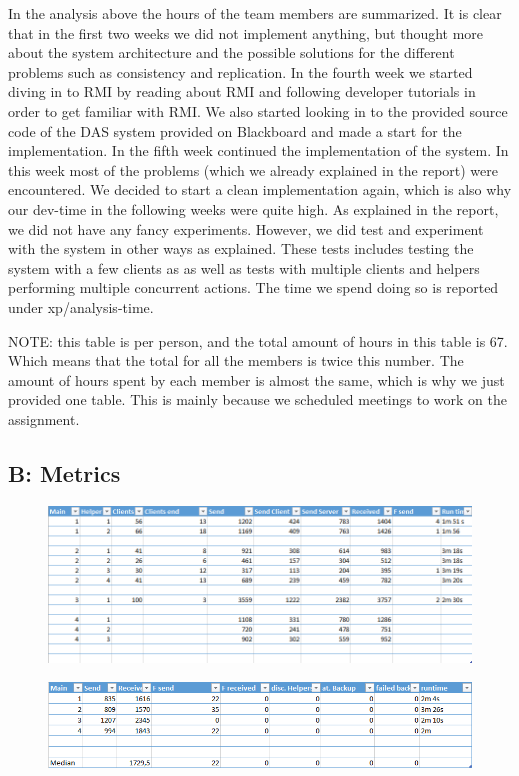 In the analysis above the hours of the team members are summarized. 
It is clear that in the first two weeks we did not implement anything, but thought more about the system architecture and the possible solutions for the different problems such as consistency and replication.
In the fourth week we started diving in to RMI by reading about RMI and following developer tutorials in order to get familiar with  RMI.
We also started looking in to the provided source code of the DAS system provided on Blackboard and made a start for the implementation.
In the fifth week continued the implementation of the system.
In this week most of the problems (which we already explained in the report) were encountered. 
We decided to start a clean implementation again, which is also why our dev-time in the following weeks were quite high.
As explained in the report, we did not have any fancy experiments. 
However, we did test and experiment with the system in other ways as explained.
These tests includes testing the system with a few clients as as well as tests with multiple clients and helpers performing multiple concurrent actions.
The time we spend doing so is reported under xp/analysis-time.

NOTE: this table is per person, and the total amount of hours in this table is 67.
Which means that the total for all the members is twice this number.
The amount of hours spent by each member is almost the same, which is why we just provided one table.
This is mainly because we scheduled meetings to work on the assignment.

\subsection{B: Metrics}
\begin{figure}[ht]
\includegraphics[scale=0.5]{M1.png}
\end{figure}

\begin{figure}[ht]
\includegraphics[scale=0.5]{M2.png}
\end{figure}


